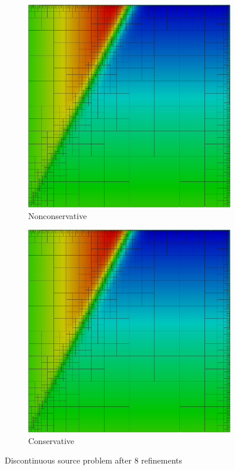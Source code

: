 \documentclass[letterpaper]{article}
\begin{document}
\begin{figure}[p]
\centering
\begin{subfigure}[t]{0.45\textwidth}
\centering
\includegraphics[width=\textwidth]{figs/Discontinuous/modified8nc.png}
\caption{Nonconservative}
\label{fig:discontinuousModified8nc}
\end{subfigure}
\begin{subfigure}[t]{0.45\textwidth}
\centering
\includegraphics[width=\textwidth]{figs/Discontinuous/modified8c.png}
\caption{Conservative}
\label{fig:discontinuousModified8c}
\end{subfigure}
\caption{Discontinuous source problem after 8 refinements}
\label{fig:discontinuous}
\end{figure}
\end{document}
